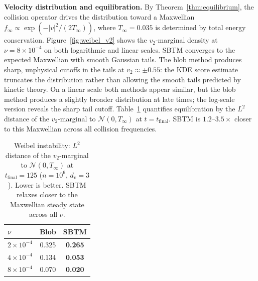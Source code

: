 \documentclass[]{article}
\numberwithin{equation}{section}
\begin{document}
\textbf{Velocity distribution and equilibration.}  By Theorem~\ref{thm:equilibrium}, the collision operator drives the distribution toward a Maxwellian $f_\infty \propto \exp(-|v|^2/(2T_\infty))$, where $T_\infty=0.035$ is determined by total energy conservation. Figure~\ref{fig:weibel_v2} shows the $v_2$-marginal density at $\nu = 8 \times 10^{-4}$ on both logarithmic and linear scales.  SBTM converges to the expected Maxwellian with smooth Gaussian tails.  The blob method produces sharp, unphysical cutoffs in the tails at $v_2 \approx \pm 0.55$: the KDE score estimate truncates the distribution rather than allowing the smooth tails predicted by kinetic theory.  On a linear scale both methods appear similar, but the blob method produces a slightly broader distribution at late times; the log-scale version reveals the sharp tail cutoff. Table~\ref{tab:weibel_thermalization} quantifies equilibration by the $L^2$ distance of the $v_2$-marginal to $\mathcal{N}(0, T_\infty)$ at $t = t_{\mathrm{final}}$.  SBTM is $1.2$--$3.5\times$ closer to this Maxwellian across all collision frequencies.

\begin{table}[h]
\centering
\begin{tabular}{lcc}
\toprule
$\nu$ & Blob & SBTM \\
\midrule
$2 \times 10^{-4}$ & 0.325 & \textbf{0.265} \\
$4 \times 10^{-4}$ & 0.134 & \textbf{0.053} \\
$8 \times 10^{-4}$ & 0.070 & \textbf{0.020} \\
\bottomrule
\end{tabular}
\caption{Weibel instability: $L^2$ distance of the $v_2$-marginal to $\mathcal{N}(0, T_\infty)$ at $ t_{\mathrm{final}}=125$ ($n = 10^6$, $d_v = 3$).  Lower is better.  SBTM relaxes closer to the Maxwellian steady state across all $\nu$. }
\label{tab:weibel_thermalization}
\end{table}
\end{document}
